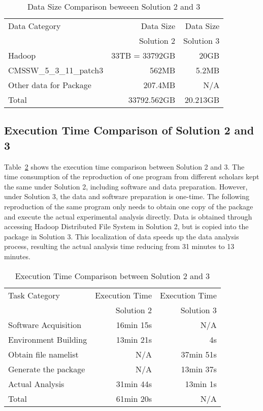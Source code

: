 \documentclass{acm_proc_article-sp}
\begin{document}
\begin{table}
    \centering
    \begin{tabular}{|l|r|r|}
    \hline
     Data Category & Data Size & Data Size \\
    & Solution 2 & Solution 3\\ \hline
    Hadoop & 33TB = 33792GB & 20GB \\ \hline
     CMSSW\_5\_3\_11\_patch3 & 562MB & 5.2MB \\ \hline
     Other data for Package & 207.4MB & N/A \\ \hline
     Total & 33792.562GB & 20.213GB \\ \hline
    \end{tabular}
    \caption{Data Size Comparison beweeen Solution 2 and 3}
    \label{table:datasize-2nd3rd}
\end{table}

\subsection{Execution Time Comparison of Solution 2 and 3}

Table~\ref{table:time-2nd3rd} shows the execution time comparison between
Solution 2 and 3. The time consumption of the reproduction of one program from
different scholars kept the same under Solution 2, including software and data
preparation. However, under Solution 3, the data and software preparation is
one-time. The following reproduction of the same program only needs to obtain
one copy of the package and execute the actual experimental analysis directly.
Data is obtained through accessing Hadoop Distributed File System in Solution 2, but is copied into the package in Solution 3. This localization of data speeds up the data analysis process, resulting the actual analysis time reducing from 31 minutes to 13 minutes.

\begin{table}
    \centering
    \begin{tabular}{|l|r|r|}
    \hline
    Task Category & Execution Time & Execution Time \\
    & Solution 2 & Solution 3\\ \hline
    Software Acquisition & 16min 15s & N/A \\ \hline
    Environment Building & 13min 21s  & 4s \\ \hline
    Obtain file namelist & N/A & 37min 51s \\ \hline
    Generate the package & N/A & 13min 37s \\ \hline
    Actual Analysis & 31min 44s & 13min 1s \\ \hline
    Total & 61min 20s & N/A \\ \hline
    \end{tabular}
    \caption{Execution Time Comparison between Solution 2 and 3}
    \label{table:time-2nd3rd}
\end{table}    
\end{document}
